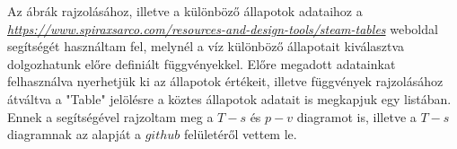Az ábrák rajzolásához, illetve a különböző állapotok adataihoz a \textit{\url{https://www.spiraxsarco.com/resources-and-design-tools/steam-tables}} weboldal segítségét használtam fel, melynél a víz különböző állapotait kiválasztva dolgozhatunk előre definiált függvényekkel. Előre megadott adatainkat felhasználva nyerhetjük ki az állapotok értékeit, illetve függvények rajzolásához átváltva a "Table" jelölésre a köztes állapotok adatait is megkapjuk egy listában. Ennek a segítségével rajzoltam meg a $T-s$ és $p-v$ diagramot is, illetve a $T-s$ diagramnak az alapját a $github$ felületéről vettem le.

